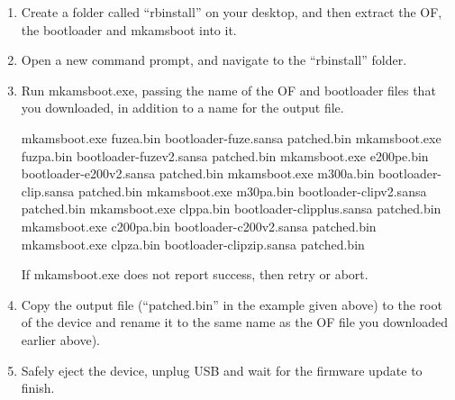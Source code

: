 \begin{enumerate}

\item Create a folder called ``rbinstall'' on your desktop, and then extract
  the OF, the bootloader and mkamsboot into it.

\item Open a new command prompt, and navigate to the ``rbinstall'' folder.

\item Run mkamsboot.exe, passing the name of the OF and bootloader files that
  you downloaded, in addition to a name for the output file.

  \begin{code}[firstline=\opt{fuze}{1}\opt{fuzev2}{2}\opt{e200v2}{3}%
            \opt{clipv1}{4}\opt{clipv2}{5}\opt{clipplus}{6}\opt{c200v2}{7}%
            \opt{clipzip}{8},%
               lastline=\opt{fuze}{1}\opt{fuzev2}{2}\opt{e200v2}{3}%
            \opt{clipv1}{4}\opt{clipv2}{5}\opt{clipplus}{6}\opt{c200v2}{7}%
            \opt{clipzip}{8}]
    mkamsboot.exe fuzea.bin bootloader-fuze.sansa patched.bin
    mkamsboot.exe fuzpa.bin bootloader-fuzev2.sansa patched.bin
    mkamsboot.exe e200pe.bin bootloader-e200v2.sansa patched.bin
    mkamsboot.exe m300a.bin bootloader-clip.sansa patched.bin
    mkamsboot.exe m30pa.bin bootloader-clipv2.sansa patched.bin
    mkamsboot.exe clppa.bin bootloader-clipplus.sansa patched.bin
    mkamsboot.exe c200pa.bin bootloader-c200v2.sansa patched.bin
    mkamsboot.exe clpza.bin bootloader-clipzip.sansa patched.bin
  \end{code}
 
  If mkamsboot.exe does not report success, then retry or abort.

\item Copy the output file (``patched.bin'' in the example given above) to the
  root of the device and rename it to the same name as the OF file you downloaded earlier 
   
   
   
    above).

\item Safely eject the device, unplug USB and wait for the firmware update to finish.
\end{enumerate}

